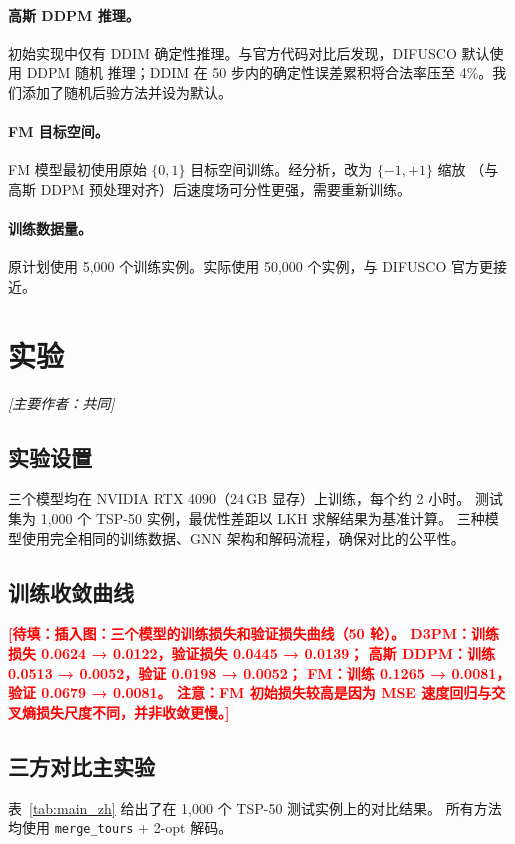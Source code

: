 \documentclass[11pt,a4paper]{article}
\newcommand{\TODO}[1]{\textcolor{red}{\textbf{[待填：#1]}}}
\begin{document}
\paragraph{高斯 DDPM 推理。}
初始实现中仅有 DDIM 确定性推理。与官方代码对比后发现，DIFUSCO 默认使用 DDPM 随机
推理；DDIM 在 50 步内的确定性误差累积将合法率压至 4\%。我们添加了随机后验方法并设为默认。

\paragraph{FM 目标空间。}
FM 模型最初使用原始 $\{0,1\}$ 目标空间训练。经分析，改为 $\{-1,+1\}$ 缩放
（与高斯 DDPM 预处理对齐）后速度场可分性更强，需要重新训练。

\paragraph{训练数据量。}
原计划使用 5{,}000 个训练实例。实际使用 50{,}000 个实例，与 DIFUSCO 官方更接近。


\section{实验}
\label{sec:experiments}
\textit{[主要作者：共同]}

\subsection{实验设置}
三个模型均在 NVIDIA RTX 4090（24\,GB 显存）上训练，每个约 2 小时。
测试集为 1{,}000 个 TSP-50 实例，最优性差距以 LKH 求解结果为基准计算。
三种模型使用完全相同的训练数据、GNN 架构和解码流程，确保对比的公平性。

\subsection{训练收敛曲线}
\TODO{插入图：三个模型的训练损失和验证损失曲线（50 轮）。
D3PM：训练损失 0.0624 → 0.0122，验证损失 0.0445 → 0.0139；
高斯 DDPM：训练 0.0513 → 0.0052，验证 0.0198 → 0.0052；
FM：训练 0.1265 → 0.0081，验证 0.0679 → 0.0081。
注意：FM 初始损失较高是因为 MSE 速度回归与交叉熵损失尺度不同，并非收敛更慢。}

\subsection{三方对比主实验}
\label{sec:three_way_zh}
表~\ref{tab:main_zh} 给出了在 1{,}000 个 TSP-50 测试实例上的对比结果。
所有方法均使用 \texttt{merge\_tours} + 2-opt 解码。
\end{document}
